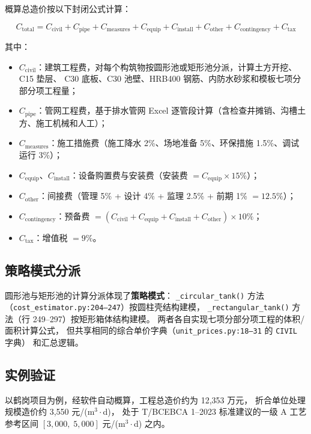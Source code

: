 \documentclass[12pt,a4paper]{ctexart}
\theoremstyle{definition}
\theoremstyle{remark}
\begin{document}
概算总造价按以下封闭公式计算：

\begin{equation}\label{eq:total-cost}
C_{\text{total}} = C_{\text{civil}} + C_{\text{pipe}} + C_{\text{measures}}
                 + C_{\text{equip}} + C_{\text{install}} + C_{\text{other}}
                 + C_{\text{contingency}} + C_{\text{tax}}
\end{equation}

其中：
\begin{itemize}
  \item $C_{\text{civil}}$：建筑工程费，对每个构筑物按圆形池或矩形池分派，计算土方开挖、C15 垫层、
        C30 底板、C30 池壁、HRB400 钢筋、内防水砂浆和模板七项分部分项工程量；
  \item $C_{\text{pipe}}$：管网工程费，基于排水管网 Excel 逐管段计算（含检查井摊销、沟槽土方、施工机械和人工）；
  \item $C_{\text{measures}}$：施工措施费（施工降水 2\%、场地准备 5\%、环保措施 1.5\%、调试运行 3\%）；
  \item $C_{\text{equip}}$、$C_{\text{install}}$：设备购置费与安装费（安装费 $= C_{\text{equip}} \times 15\%$）；
  \item $C_{\text{other}}$：间接费（管理 5\% + 设计 4\% + 监理 2.5\% + 前期 1\% $= 12.5\%$）；
  \item $C_{\text{contingency}}$：预备费 $= (C_{\text{civil}} + C_{\text{equip}} + C_{\text{install}} + C_{\text{other}}) \times 10\%$；
  \item $C_{\text{tax}}$：增值税 $= 9\%$。
\end{itemize}

\subsection{策略模式分派}

圆形池与矩形池的计算分派体现了\textbf{策略模式}：
\texttt{\_circular\_tank()} 方法（\texttt{cost\_estimator.py:204--247}）按圆柱壳结构建模，
\texttt{\_rectangular\_tank()} 方法（行 249--297）按矩形箱体结构建模。
两者各自实现七项分部分项工程的体积/面积计算公式，
但共享相同的综合单价字典（\texttt{unit\_prices.py:18--31} 的 \texttt{CIVIL} 字典）
和汇总逻辑。

\subsection{实例验证}

以鹤岗项目为例，经软件自动概算，工程总造价约为 12,353 万元，
折合单位处理规模造价约 3,550 元/(m$^3\cdot$d)，
处于 T/BCEBCA 1--2023 标准建议的一级 A 工艺参考区间 $[3,000,\; 5,000]$ 元/(m$^3\cdot$d) 之内。
\end{document}
